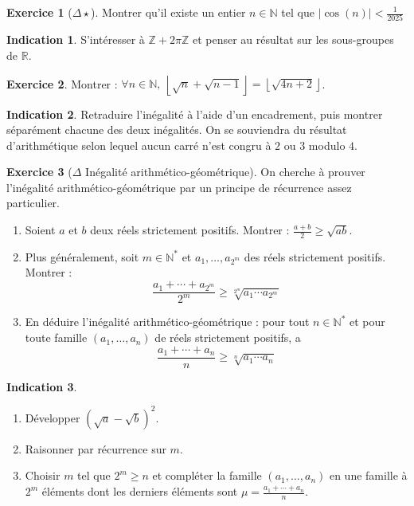 \documentclass[french]{book}
\newcommand{\N}{\mathbb{N}}
\newcommand{\Z}{\mathbb{Z}}
\newcommand{\R}{\mathbb{R}}
\newcommand{\st}{^*}
\theoremstyle{definition}
\newtheorem{ex}{Exercice}[chapter]
\theoremstyle{theorem}
\newtheorem*{ind}{Indication}
\theoremstyle{remark}
\begin{document}
\begin{ex}[$\Delta\star$]
	Montrer qu'il existe un entier $n\in\N$ tel que $\lvert\cos(n)\rvert<\displaystyle\frac{1}{2025}$
\end{ex}

\begin{ind}
	S'intéresser à $\Z+2\pi\Z$ et penser au résultat sur les sous-groupes de $\R$.
\end{ind}

\begin{ex}
	Montrer : $\forall n\in\N,\ \left\lfloor\sqrt{n}+\sqrt{n-1}\right\rfloor=\left\lfloor\sqrt{4n+2}\right\rfloor$.
\end{ex}

\begin{ind}
	Retraduire l'inégalité à l'aide d'un encadrement, puis montrer séparément chacune des deux inégalités. On se souviendra du résultat d'arithmétique selon lequel aucun carré n'est congru à $2$ ou $3$ modulo $4$.
\end{ind}

\begin{ex}[$\Delta$ Inégalité arithmético-géométrique]
	On cherche à prouver l'inégalité arithmético-géométrique par un principe de récurrence assez particulier.
	\begin{enumerate}
		\item Soient $a$ et $b$ deux réels strictement positifs. Montrer : $\displaystyle\frac{a+b}{2}\geqslant\sqrt{ab}$.
		\item Plus généralement, soit $m\in\N\st$ et $a_1,\ldots,a_{2^m}$ des réels strictement positifs. Montrer : $$\frac{a_1+\cdots+a_{2^m}}{2^m}\geqslant\sqrt[2^m]{a_1\cdots a_{2^m}}$$
		\item En déduire l'inégalité arithmético-géométrique : pour tout $n\in\N\st$ et pour toute famille $(a_1,\ldots,a_n)$ de réels strictement positifs, a $$\frac{a_1+\cdots+a_{n}}{n}\geqslant\sqrt[n]{a_1\cdots a_{n}}$$
	\end{enumerate}
\end{ex}

\begin{ind}
	\begin{enumerate}
		\item Développer $(\sqrt{a}-\sqrt{b})^2$.
		\item Raisonner par récurrence sur $m$.
		\item Choisir $m$ tel que $2^m\geqslant n$ et compléter la famille $(a_1,\ldots,a_n)$ en une famille à $2^m$ éléments dont les derniers éléments sont $\mu=\displaystyle\frac{a_1+\cdots+a_n}{n}$.
	\end{enumerate}
\end{ind}
\end{document}
